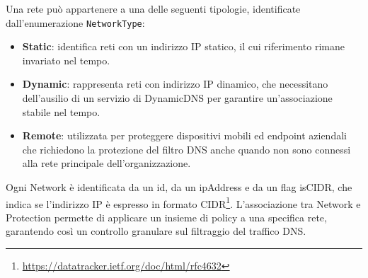 Una rete può appartenere a una delle seguenti tipologie, identificate dall'enumerazione \texttt{NetworkType}:
\begin{itemize}
  \item \textbf{Static}: identifica reti con un indirizzo IP statico, il cui riferimento rimane invariato nel tempo.
  \item \textbf{Dynamic}: rappresenta reti con indirizzo IP dinamico, che necessitano dell’ausilio di un servizio di DynamicDNS per garantire un'associazione stabile nel tempo.
  \item \textbf{Remote}: utilizzata per proteggere dispositivi mobili ed endpoint aziendali che richiedono la protezione del filtro DNS anche quando non sono connessi alla rete principale dell'organizzazione.
\end{itemize}

Ogni Network è identificata da un id, da un ipAddress e da un flag isCIDR, che indica se l’indirizzo IP è espresso in formato CIDR\footnote{\url{https://datatracker.ietf.org/doc/html/rfc4632}}. L’associazione tra Network e Protection permette di applicare un insieme di policy a una specifica rete, garantendo così un controllo granulare sul filtraggio del traffico DNS.
